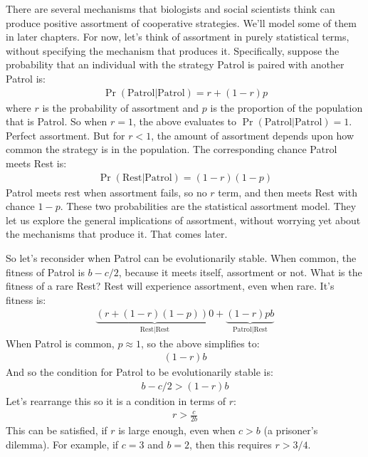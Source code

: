 \documentclass[10pt,reqno]{amsbook}
\numberwithin{equation}{chapter}
\begin{document}
There are several mechanisms that biologists and social scientists think can produce positive assortment of cooperative strategies. We'll model some of them in later chapters. For now, let's think of assortment in purely statistical terms, without specifying the mechanism that produces it. Specifically, suppose the probability that an individual with the strategy Patrol is paired with another Patrol is:
\begin{align*}
	\Pr(\text{Patrol}|\text{Patrol}) = r + (1-r)p
\end{align*}
where $r$ is the probability of assortment and $p$ is the proportion of the population that is Patrol. So when $r=1$, the above evaluates to $\Pr(\text{Patrol}|\text{Patrol})=1$. Perfect assortment. But for $r<1$, the amount of assortment depends upon how common the strategy is in the population. The corresponding chance Patrol meets Rest is:
\begin{align*}
	\Pr(\text{Rest}|\text{Patrol}) = (1-r)(1-p)
\end{align*}
Patrol meets rest when assortment fails, so no $r$ term, and then meets Rest with chance $1-p$. These two probabilities are the statistical assortment model. They let us explore the general implications of assortment, without worrying yet about the mechanisms that produce it. That comes later.

So let's reconsider when Patrol can be evolutionarily stable. When common, the fitness of Patrol is $b-c/2$, because it meets itself, assortment or not. What is the fitness of a rare Rest? Rest will experience assortment, even when rare. It's fitness is:
\begin{align*}
	\underbrace{(r + (1-r)(1-p))0}_{\text{Rest|Rest}} + \underbrace{(1-r)pb}_{\text{Patrol|Rest}} 
\end{align*}
When Patrol is common, $p \approx 1$, so the above simplifies to:
\begin{align*}
	(1-r)b
\end{align*}
And so the condition for Patrol to be evolutionarily stable is:
\begin{align*}
	b-c/2 > (1-r)b
\end{align*}
Let's rearrange this so it is a condition in terms of $r$:
\begin{align*}
	r  > \frac{c}{2b}
\end{align*}
This can be satisfied, if $r$ is large enough, even when $c>b$ (a prisoner's dilemma). For example, if $c=3$ and $b=2$, then this requires $r>3/4$. 
\end{document}
